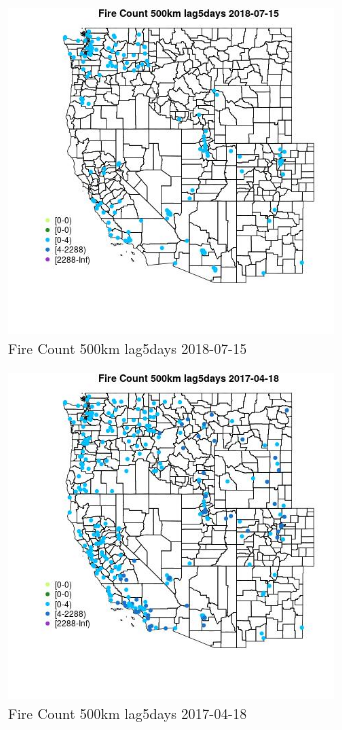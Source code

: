 \begin{figure} 
\centering  
\includegraphics[width=0.77\textwidth]{Code_Outputs/Report_ML_input_PM25_Step4_part_e_de_duplicated_aves_compiled_2019-05-21wNAs_MapObsFire_Count_500km_lag5days2018-07-15.jpg} 
\caption{\label{fig:Report_ML_input_PM25_Step4_part_e_de_duplicated_aves_compiled_2019-05-21wNAsMapObsFire_Count_500km_lag5days2018-07-15}Fire Count 500km lag5days 2018-07-15} 
\end{figure} 
 

\clearpage 

\begin{figure} 
\centering  
\includegraphics[width=0.77\textwidth]{Code_Outputs/Report_ML_input_PM25_Step4_part_e_de_duplicated_aves_compiled_2019-05-21wNAs_MapObsFire_Count_500km_lag5days2017-04-18.jpg} 
\caption{\label{fig:Report_ML_input_PM25_Step4_part_e_de_duplicated_aves_compiled_2019-05-21wNAsMapObsFire_Count_500km_lag5days2017-04-18}Fire Count 500km lag5days 2017-04-18} 
\end{figure} 
 

